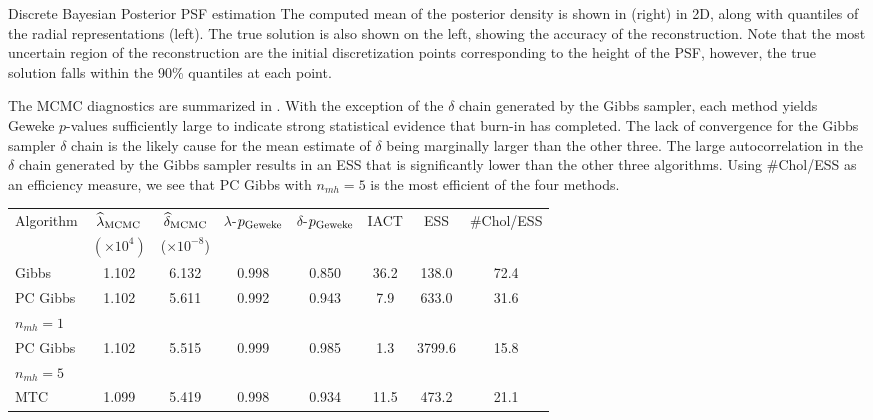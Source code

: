 \begin{chapter}{Discrete Bayesian Posterior PSF estimation}
The computed mean of the posterior density is shown in  (right) in 2D, along with quantiles of the radial representations (left). 
The true solution is also shown on the left, showing the accuracy of the reconstruction.  
Note that the most uncertain region of the reconstruction are the initial discretization points corresponding to the height of the PSF, however, the true solution falls within the 90\% quantiles at each point.

The MCMC diagnostics are summarized in . 
With the exception of the $\delta$ chain generated by the Gibbs sampler, each method yields Geweke $p$-values sufficiently large to indicate strong statistical evidence that burn-in has completed. 
The lack of convergence for the Gibbs sampler $\delta$ chain is the likely cause for the mean estimate of $\delta$ being marginally larger than the other three. 
The large autocorrelation in the $\delta$ chain generated by the Gibbs sampler results in an ESS that is significantly lower than the other three algorithms. 
Using \#Chol/ESS as an efficiency measure, we see that PC Gibbs with $n_{mh}=5$ is the most efficient of the four methods.
\begin{table}[h]
\begin{center}
  \begin{tabular}{l|ccccccc}
    \hline
    Algorithm       & $\hat{\lambda}_{\rm MCMC}$& $\hat{\delta}_{\rm MCMC}$  & $\lambda$-$p_{\rm Geweke}$&$\delta$-$p_{\rm Geweke}$& IACT & ESS    & \#Chol/ESS \\
     & $(\times 10^{4})$ & ($\times 10^{-8}$) & & \\
    \hline
	      Gibbs &                 1.102 &                 6.132 &                    0.998 &                    0.850& 36.2 &  138.0 &      72.4 \\
PC Gibbs &                 1.102 &                 5.611 &                    0.992 &                    0.943&  7.9 &  633.0 &      31.6 \\
\hspace{.2in} $n_{mh}= 1$ & & & & & & & \\
PC Gibbs &                 1.102 &                 5.515&                    0.999 &                    0.985&  1.3 & 3799.6 &      15.8 \\
\hspace{.2in} $n_{mh}= 5$ & & & & & & & \\
		MTC &                 1.099 &                 5.419 &                    0.998 &                    0.934& 11.5 &  473.2 &      21.1 \\

\end{tabular}
\end{center}
\end{table}
\end{chapter}
